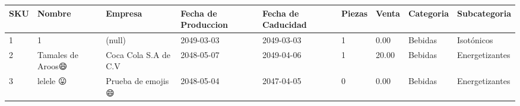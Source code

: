 \documentclass[a4paper,12pt]{article}
\begin{document}
\footnotesize  
\setlength\LTleft{-50pt} 
\setlength\LTright{-100pt}  
\begin{landscape} 
\thispagestyle{empty}
\begin{longtable}{|p{4cm}|p{2.5cm}|p{2.5cm}|p{1.8cm}|p{1.8cm}|p{1cm}|p{1cm}|p{3cm}|p{3cm}||}
\hline 
\hline
\textbf{SKU} & \textbf{Nombre} & \textbf{Empresa} & \textbf{Fecha de Produccion} & \textbf{Fecha de Caducidad} & \textbf{Piezas} & \textbf{Venta} & \textbf{Categoria} & \textbf{Subcategoria}\\ \hline \hline1 & 1 & (null) & 2049-03-03 & 2049-03-03 & 1 & 0.00 & Bebidas & Isotónicos \\ \hline 
2 & Tamales de Aroos😄️ & Coca Cola S.A de C.V & 2048-05-07 & 2049-04-06 & 1 & 20.00 & Bebidas & Energetizantes \\ \hline 
3 & lelele 😛️ & Prueba de emojis 😄️ & 2048-05-04 & 2047-04-05 & 0 & 0.00 & Bebidas & Energetizantes \\ \hline 
\end{longtable}
\thispagestyle{empty}
\end{landscape}
\end{document}
